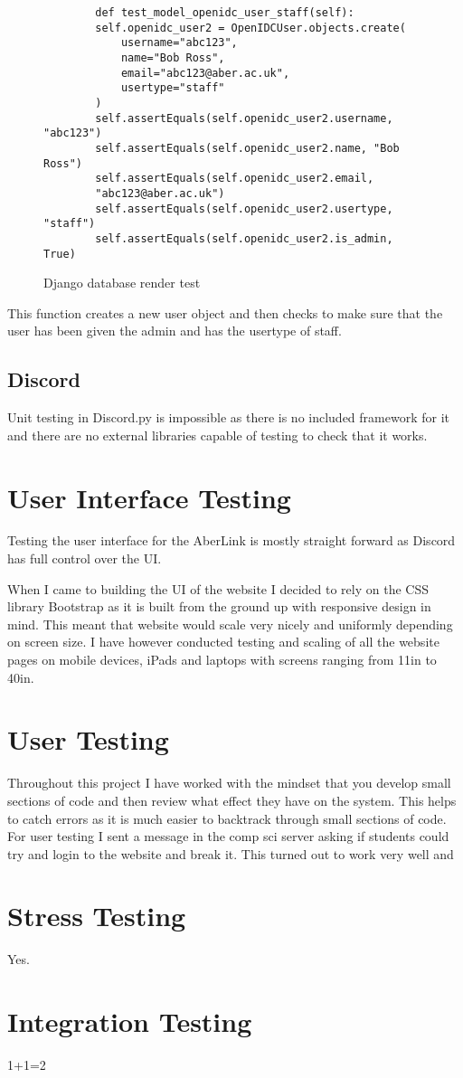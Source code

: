 \begin{figure}[H]
    \begin{verbatim}
        def test_model_openidc_user_staff(self):
        self.openidc_user2 = OpenIDCUser.objects.create(
            username="abc123",
            name="Bob Ross",
            email="abc123@aber.ac.uk",
            usertype="staff"
        )
        self.assertEquals(self.openidc_user2.username, "abc123")
        self.assertEquals(self.openidc_user2.name, "Bob Ross")
        self.assertEquals(self.openidc_user2.email, 
        "abc123@aber.ac.uk")
        self.assertEquals(self.openidc_user2.usertype, "staff")
        self.assertEquals(self.openidc_user2.is_admin, True)
    \end{verbatim}
    \caption{Django database render test}
    \label{fig:django-database}
\end{figure}
This function creates a new user object and then checks to make sure that the user has been given the admin and has the usertype of staff.

\subsection{Discord}
Unit testing in Discord.py is impossible as there is no included framework for it and there are no external libraries capable of testing to check that it works.

\section{User Interface Testing}
Testing the user interface for the AberLink is mostly straight forward as Discord has full control over the UI.

When I came to building the UI of the website I decided to rely on the CSS library Bootstrap \cite{bootstrap} as it is built from the ground up with responsive design in mind. This meant that website would scale very nicely and uniformly depending on screen size. I have however conducted testing and scaling of all the website pages on mobile devices, iPads and laptops with screens ranging from 11in to 40in.

\section{User Testing}
Throughout this project I have worked with the mindset that you develop small sections of code and then review what effect they have on the system. This helps to catch errors as it is much easier to backtrack through small sections of code.
For user testing I sent a message in the comp sci server asking if students could try and login to the website and break it. This turned out to work very well and 

\section{Stress Testing}
Yes.

\section{Integration Testing}
1+1=2